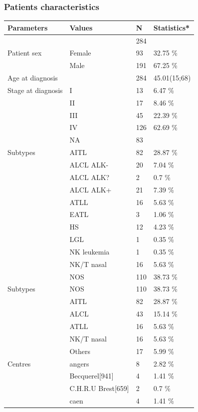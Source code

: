 \documentclass[a4paper,11pt] {article}
\begin{document}
 \subsubsection{Patients characteristics}
\begin{longtable}{llll}
  \hline
Parameters & Values & N & Statistics* \\ 
  \hline
 &  & 284 &  \\ 
  Patient sex & Female & 93 & 32.75 \% \\ 
   & Male & 191 & 67.25 \% \\ 
  Age at diagnosis &  & 284 & 45.01(15;68) \\ 
  Stage at diagnosis & I & 13 & 6.47 \% \\ 
   & II & 17 & 8.46 \% \\ 
   & III & 45 & 22.39 \% \\ 
   & IV & 126 & 62.69 \% \\ 
   & NA & 83 &  \\ 
  Subtypes & AITL & 82 & 28.87 \% \\ 
   & ALCL ALK- & 20 & 7.04 \% \\ 
   & ALCL ALK? & 2 & 0.7 \% \\ 
   & ALCL ALK+ & 21 & 7.39 \% \\ 
   & ATLL & 16 & 5.63 \% \\ 
   & EATL & 3 & 1.06 \% \\ 
   & HS & 12 & 4.23 \% \\ 
   & LGL & 1 & 0.35 \% \\ 
   & NK leukemia & 1 & 0.35 \% \\ 
   & NK/T nasal & 16 & 5.63 \% \\ 
   & NOS & 110 & 38.73 \% \\ 
  Subtypes & NOS & 110 & 38.73 \% \\ 
   & AITL & 82 & 28.87 \% \\ 
   & ALCL & 43 & 15.14 \% \\ 
   & ATLL & 16 & 5.63 \% \\ 
   & NK/T nasal & 16 & 5.63 \% \\ 
   & Others & 17 & 5.99 \% \\ 
  Centres & angers & 8 & 2.82 \% \\ 
   & Becquerel[941] & 4 & 1.41 \% \\ 
   & C.H.R.U Brest[659] & 2 & 0.7 \% \\ 
   & caen & 4 & 1.41 \% \\ 

\end{longtable}
\end{document}
